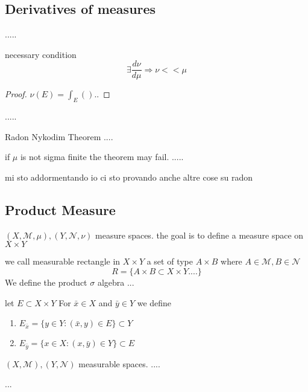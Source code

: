 \subsection*{Derivatives of measures}
.....

necessary condition
\[ \exists \frac{d \nu}{d \mu} \Rightarrow \nu << \mu \]

\begin{proof}
    \(\nu(E) = \int_E () .. \)
\end{proof}

.....

\begin{theorem}
    Radon Nykodim Theorem
    ....
\end{theorem}

\begin{remark}
    if \(\mu\) is not sigma finite the theorem may fail.
    ..... 
\end{remark}

mi sto addormentando io ci sto provando anche
altre cose su radon 

\subsection*{Product Measure}
\( (X, \mathcal{M}, \mu), (Y, \mathcal{N}, \nu) \) measure spaces.
the goal is to define a measure space on \(X \times Y\)
\begin{definition}
    we call measurable rectangle in \(X \times Y\) a set of type \(A \times B\) where \(A \in \mathcal{M}, B \in \mathcal{N}\)
    \[  R = \{ A \times B \subset X\times Y ....\}\]
    We define the product \(\sigma\) algebra 
    ...
\end{definition}
\begin{definition}
    let \(E \subset X \times Y \) For \( \bar{x} \in X \) and \(\bar{y} \in Y \) we define
    \begin{enumerate}
        \item \( E_{\bar{x}} = \{ y \in Y: \left( \bar{x}, y \right) \in E \} \subset Y \)
        \item \( E_{\bar{y}} = \{ x \in X: \left( x, \bar{y} \right) \in Y \} \subset E \)
    \end{enumerate}
\end{definition}

\begin{proposition}
    \(\left( X, \mathcal{M} \right), \left( Y, \mathcal{N} \right)\) measurable spaces. 
    ....

\end{proposition}
...

